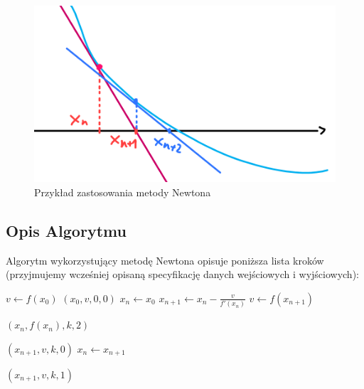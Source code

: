 \documentclass[10pt]{article}
\begin{document}
\begin{figure}[H]
    \centering
    \includegraphics{metoda-newtona.png}
    \caption{Przykład zastosowania metody Newtona}
\end{figure}

\subsection{Opis Algorytmu}

Algorytm wykorzystujący metodę Newtona opisuje poniższa lista kroków (przyjmujemy wcześniej opisaną specyfikację danych wejściowych i wyjściowych):

\begin{algorithm}[H]
    \begin{algorithmic}[1]
      \State $v \gets f(x_0)$\label{2.alg.begin}
      \label{2.alg.firstif}
        \State \Return $(x_0, v, 0, 0)$
      \EndIf
      \State $x_{n} \gets x_0$
      \label{2.alg.for.begin}
        \State $x_{n+1} \gets x_n - \frac{v}{f'(x_n)}$\label{2.alg.for.rec-step}
        \State $v \gets f(x_{n+1})$

        \label{2.alg.for.derivative-near-zero}
            \State \Return $(x_n, f(x_n), k, 2)$
        \EndIf

        \label{2.alg.for.outif}
            \State \Return $(x_{n+1}, v, k, 0)$
        \EndIf
        \State $x_n \gets x_{n+1}$\label{2.alg.for.continue}
      \EndFor

      \State \Return $(x_{n+1}, v, k, 1)$
    \end{algorithmic}
\end{algorithm}
\end{document}
